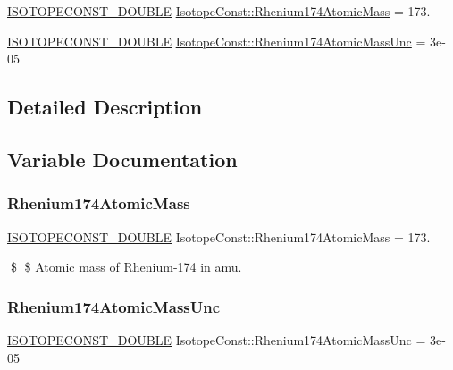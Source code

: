 \begin{DoxyCompactItemize}
\item 
\mbox{\hyperlink{group___isotope_const-_macros_ga8f45a7272ce02c0b4c65c44636ed719a}{I\+S\+O\+T\+O\+P\+E\+C\+O\+N\+S\+T\+\_\+\+D\+O\+U\+B\+LE}} \mbox{\hyperlink{group___isotope_const-_rhenium-_re174_ga7d05362f2de3d3d579f2b9070af9bfd7}{Isotope\+Const\+::\+Rhenium174\+Atomic\+Mass}} = 173.
\item 
\mbox{\hyperlink{group___isotope_const-_macros_ga8f45a7272ce02c0b4c65c44636ed719a}{I\+S\+O\+T\+O\+P\+E\+C\+O\+N\+S\+T\+\_\+\+D\+O\+U\+B\+LE}} \mbox{\hyperlink{group___isotope_const-_rhenium-_re174_ga3adf74c0d73cefc5235b9bf9c11c0f1c}{Isotope\+Const\+::\+Rhenium174\+Atomic\+Mass\+Unc}} = 3e-\/05
\end{DoxyCompactItemize}


\subsection{Detailed Description}


\subsection{Variable Documentation}
\mbox{\label{group___isotope_const-_rhenium-_re174_ga7d05362f2de3d3d579f2b9070af9bfd7}} 
\subsubsection{\texorpdfstring{Rhenium174\+Atomic\+Mass}{Rhenium174AtomicMass}}
{\footnotesize\ttfamily \mbox{\hyperlink{group___isotope_const-_macros_ga8f45a7272ce02c0b4c65c44636ed719a}{I\+S\+O\+T\+O\+P\+E\+C\+O\+N\+S\+T\+\_\+\+D\+O\+U\+B\+LE}} Isotope\+Const\+::\+Rhenium174\+Atomic\+Mass = 173.}

\$ \$ Atomic mass of Rhenium-\/174 in amu. \mbox{\label{group___isotope_const-_rhenium-_re174_ga3adf74c0d73cefc5235b9bf9c11c0f1c}} 
\subsubsection{\texorpdfstring{Rhenium174\+Atomic\+Mass\+Unc}{Rhenium174AtomicMassUnc}}
{\footnotesize\ttfamily \mbox{\hyperlink{group___isotope_const-_macros_ga8f45a7272ce02c0b4c65c44636ed719a}{I\+S\+O\+T\+O\+P\+E\+C\+O\+N\+S\+T\+\_\+\+D\+O\+U\+B\+LE}} Isotope\+Const\+::\+Rhenium174\+Atomic\+Mass\+Unc = 3e-\/05}

